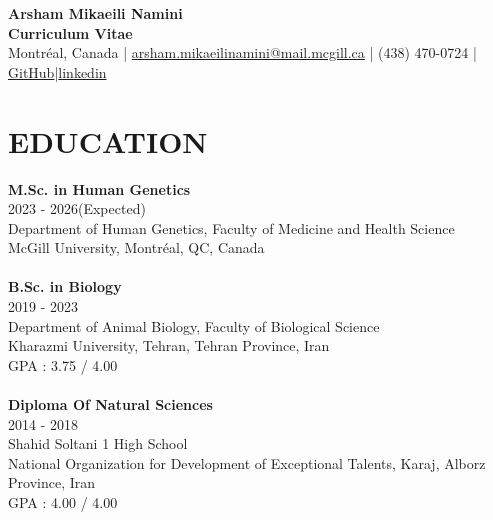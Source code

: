 \documentclass[a4paper,9pt]{extarticle}
\begin{document}
\pagestyle{empty}

\begin{center}
\textbf{\Large Arsham Mikaeili Namini }\\[7pt] %
\textbf{Curriculum Vitae}\\[1pt] %
Montréal, Canada | \href{mailto:arsham.mikaeilinamini@mail.mcgill.ca}{arsham.mikaeilinamini@mail.mcgill.ca} | (438) 470-0724 | \href{https://www.linkedin.com/in/arsham-mikaeili-namini-a891ba186/}{GitHub}|\href{https://github.com/Arshammik}{linkedin} %
\end{center}


\section*{EDUCATION}

\noindent
\newline
\textbf{M.Sc. in Human Genetics} \\
2023 - 2026(Expected) \\ 
Department of Human Genetics, Faculty of Medicine and Health Science  \\
McGill University, Montréal, QC, Canada \\ 
\\
\noindent
\textbf{B.Sc. in Biology} \\
2019 - 2023 \\ 
Department of Animal Biology, Faculty of Biological Science\\
Kharazmi University, Tehran, Tehran Province, Iran \\ 
GPA : 3.75 / 4.00\\
\\
\noindent
\textbf{Diploma Of Natural Sciences} \\
2014 - 2018 \\ 
Shahid Soltani 1 High School\\ 
National Organization for Development of Exceptional Talents, Karaj, Alborz Province, Iran \\ 
GPA : 4.00 / 4.00\\


\end{document}
